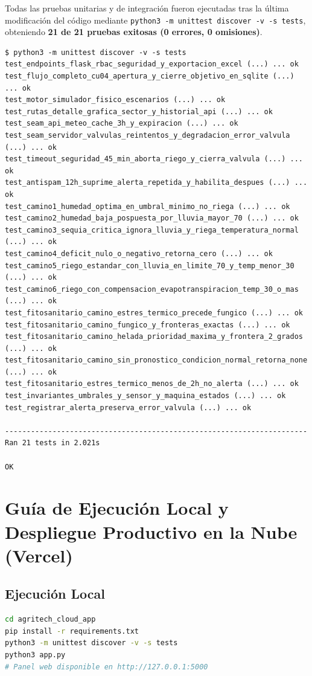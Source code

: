 \documentclass[11pt,letterpaper]{report}
\begin{document}
Todas las pruebas unitarias y de integración fueron ejecutadas tras la última modificación del código mediante \texttt{python3 -m unittest discover -v -s tests}, obteniendo \textbf{21 de 21 pruebas exitosas (0 errores, 0 omisiones)}.

\begin{lstlisting}[caption={Salida textual real de la suite de pruebas automatizadas y verificación de integración.}]
$ python3 -m unittest discover -v -s tests
test_endpoints_flask_rbac_seguridad_y_exportacion_excel (...) ... ok
test_flujo_completo_cu04_apertura_y_cierre_objetivo_en_sqlite (...) ... ok
test_motor_simulador_fisico_escenarios (...) ... ok
test_rutas_detalle_grafica_sector_y_historial_api (...) ... ok
test_seam_api_meteo_cache_3h_y_expiracion (...) ... ok
test_seam_servidor_valvulas_reintentos_y_degradacion_error_valvula (...) ... ok
test_timeout_seguridad_45_min_aborta_riego_y_cierra_valvula (...) ... ok
test_antispam_12h_suprime_alerta_repetida_y_habilita_despues (...) ... ok
test_camino1_humedad_optima_en_umbral_minimo_no_riega (...) ... ok
test_camino2_humedad_baja_pospuesta_por_lluvia_mayor_70 (...) ... ok
test_camino3_sequia_critica_ignora_lluvia_y_riega_temperatura_normal (...) ... ok
test_camino4_deficit_nulo_o_negativo_retorna_cero (...) ... ok
test_camino5_riego_estandar_con_lluvia_en_limite_70_y_temp_menor_30 (...) ... ok
test_camino6_riego_con_compensacion_evapotranspiracion_temp_30_o_mas (...) ... ok
test_fitosanitario_camino_estres_termico_precede_fungico (...) ... ok
test_fitosanitario_camino_fungico_y_fronteras_exactas (...) ... ok
test_fitosanitario_camino_helada_prioridad_maxima_y_frontera_2_grados (...) ... ok
test_fitosanitario_camino_sin_pronostico_condicion_normal_retorna_none (...) ... ok
test_fitosanitario_estres_termico_menos_de_2h_no_alerta (...) ... ok
test_invariantes_umbrales_y_sensor_y_maquina_estados (...) ... ok
test_registrar_alerta_preserva_error_valvula (...) ... ok

----------------------------------------------------------------------
Ran 21 tests in 2.021s

OK
\end{lstlisting}

\section{Guía de Ejecución Local y Despliegue Productivo en la Nube (Vercel)}
\subsection{Ejecución Local}
\begin{lstlisting}[language=bash, caption={Comandos reproducibles para ejecución local y verificación de pruebas.}]
cd agritech_cloud_app
pip install -r requirements.txt
python3 -m unittest discover -v -s tests
python3 app.py
# Panel web disponible en http://127.0.0.1:5000
\end{lstlisting}
\end{document}
